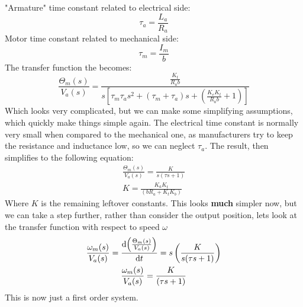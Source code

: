 "Armature" time constant related to electrical side:
\begin{equation}
  \tau_a = \frac{L_a}{R_a}
\end{equation}
Motor time constant related to mechanical side:
\begin{equation}
  \tau_m = \frac{I_m}{b}
\end{equation}
The transfer function the becomes:
\begin{equation}
  \frac{\Theta_m(s)}{V_a(s)} = \frac{\frac{K_t}{R_a b}}{s\left[ \tau_m \tau_a s^2 + (\tau_m + \tau_a)s + \left( \frac{K_e K_t}{R_a b} + 1 \right)  \right]}
\end{equation}
Which looks very complicated, but we can make some simplifying assumptions, which quickly make things simple again. The electrical time constant is normally very small when compared to the mechanical one, as manufacturers try to keep the resistance and inductance low, so we can neglect $\tau_a$. The result, then simplifies to the following equation:
\begin{gather}
  \frac{\Theta_m(s)}{V_a(s)} = \frac{K}{s(\tau s + 1)}\\
  K = \frac{K_a K_t}{(bR_a + K_t K_b)}
\end{gather}
Where $K$ is the remaining leftover constants. This looks \textbf{much} simpler now, but we can take a step further, rather than consider the output position, lets look at the transfer function with respect to speed $\omega$
\begin{gather}
  \frac{\omega_m (s)}{V_a (s)} = \frac{\dif \left( \frac{\Theta_m (s)}{V_a (s)} \right)}{\dif t} = s \left( \frac{K}{s(\tau s +1)} \right)\\
  \frac{\omega_m (s)}{V_a (s)} = \frac{K}{(\tau s +1)}
\end{gather}
This is now just a first order system.